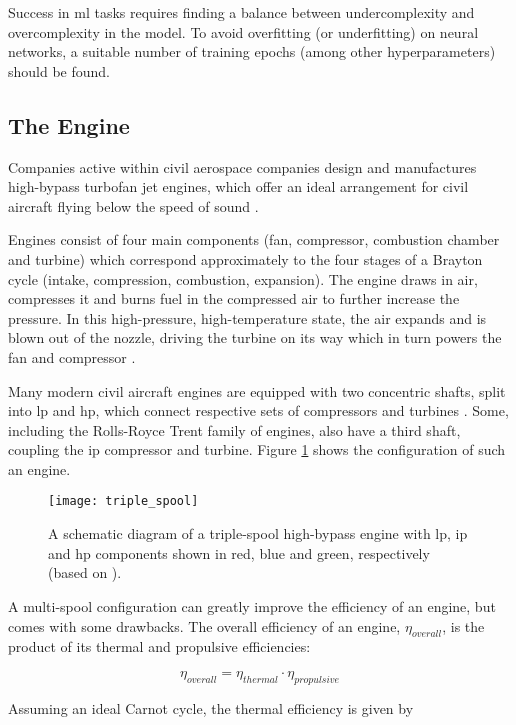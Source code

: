Success in \ac{ml} tasks requires finding a balance between undercomplexity and overcomplexity in the model. To avoid overfitting (or underfitting) on neural networks, a suitable number of training epochs (among other hyperparameters) should be found.

\subsection{The Engine}
Companies active within civil aerospace companies design and manufactures high-bypass turbofan jet engines, which offer an ideal arrangement for civil aircraft flying below the speed of sound \cite[]{rolls-royce_plc_jet_2015}.

Engines consist of four main components (fan, compressor, combustion chamber and turbine) which correspond approximately to the four stages of a Brayton cycle (intake, compression, combustion, expansion). The engine draws in air, compresses it and burns fuel in the compressed air to further increase the pressure. In this high-pressure, high-temperature state, the air expands and is blown out of the nozzle, driving the turbine on its way which in turn powers the fan and compressor \cite[]{rolls-royce_plc_jet_2015}.

Many modern civil aircraft engines are equipped with two concentric shafts, split into \ac{lp} and \ac{hp}, which connect respective sets of compressors and turbines \cite[]{spittle_gas_2003}. Some, including the Rolls-Royce Trent family of engines, also have a third shaft, coupling the \ac{ip} compressor and turbine. Figure \ref{fig:triple_spool} shows the configuration of such an engine.

\begin{figure}
    \centering
    \texttt{[image: triple\_spool]}
    \caption{\label{fig:triple_spool} A schematic diagram of a triple-spool high-bypass engine with \ac{lp}, \ac{ip} and \ac{hp} components shown in red, blue and green, respectively (based on \protect\cite[]{rolls-royce_plc_jet_2015}).}
\end{figure}

A multi-spool configuration can greatly improve the efficiency of an engine, but comes with some drawbacks. The overall efficiency of an engine, \(\eta_{overall}\), is the product of its thermal and propulsive efficiencies:

\[
    \eta_{overall} = \eta_{thermal} \cdot \eta_{propulsive}
\]

Assuming an ideal Carnot cycle, the thermal efficiency is given by

